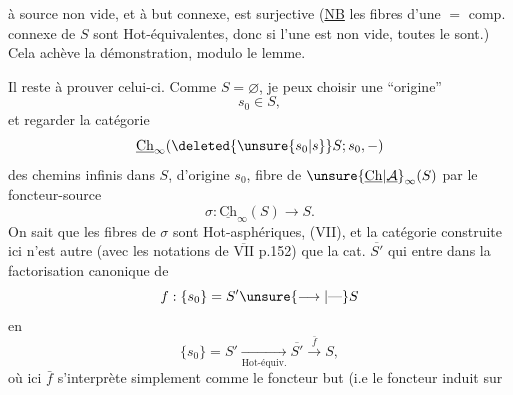
à source non vide, et à but connexe, est surjective
(\uline{NB}  les fibres d'une $=$ comp. connexe
de $S$ sont Hot-équivalentes\deleted{\unsure{)}}, donc si l'une est non
vide, toutes le sont.) Cela achève la démonstration, modulo le lemme.

Il reste à prouver celui-ci. Comme $S=\varnothing$, je
peux choisir une ``origine''
\[
s_0\in S,
\]
et regarder la catégorie
\[
\underline{\mathrm{Ch}}_{\infty}(\deleted{\unsure{s_0|s}}S;s_0,-)
\]
des chemins infinis dans $S$, d'origine $s_0$, fibre
de $\unsure{\underline{\mathrm{Ch}}|\underline{\mathcal A}}_{\infty}(S)$ par le foncteur-source \deleted{\unsure{$\sigma$}}
\[
\sigma:\underline{\mathrm{Ch}}_{\infty}(S)\longrightarrow S.
\]
On sait que les fibres de $\sigma$ sont Hot-asphériques,
(VII), et la catégorie construite ici n'est
autre  (avec les notations de \uline{$\overline{\mathrm{VII}}$} p.152) que
la  cat. $\overline{S'}$ qui entre dans la factorisation
canonique de
\[
f:\{s_0\}=S'\unsure{\longrightarrow|\text{---}}S
\]
en
\[
\{s_0\}=S'\xrightarrow[\text{Hot-équiv.}]{}\overline{S'}
 \xrightarrow{\bar f} S,
\]
où ici $\bar f$ s'interprète simplement comme
le foncteur but (i.e le foncteur induit sur

